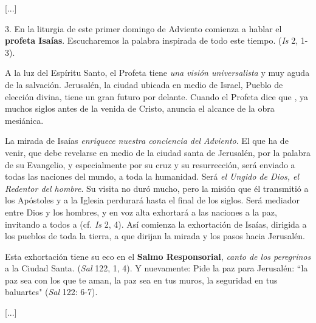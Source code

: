 \begin{body}
\begin{body}
		{[}...{]}
		
		3. En la liturgia de este primer domingo de Adviento comienza a hablar el \textbf{profeta Isaías}. Escucharemos la palabra inspirada de todo este tiempo.  (\emph{Is} 2, 1-3).
		
		A la luz del Espíritu Santo, el Profeta tiene \emph{una visión universalista} y muy aguda de la salvación. Jerusalén, la ciudad ubicada en medio de Israel, Pueblo de elección divina, tiene un gran futuro por delante. Cuando el Profeta dice que , ya muchos siglos antes de la venida de Cristo, anuncia el alcance de la obra mesiánica.
		
		La mirada de Isaías \emph{enriquece nuestra conciencia del Adviento}. El que ha de venir, que debe revelarse  en medio de la ciudad santa de Jerusalén, por la palabra de su Evangelio, y especialmente por su cruz y su resurrección, será enviado a todas las naciones del mundo, a toda la humanidad. Será \emph{el Ungido de Dios, el Redentor del hombre}. Su visita no duró mucho, pero la misión que él transmitió a los Apóstoles y a la Iglesia perdurará hasta el final de los siglos. Será mediador entre Dios y los hombres, y en voz alta exhortará a las naciones a la paz, invitando a todos a  (cf. \emph{Is} 2, 4). Así comienza la exhortación de Isaías, dirigida a los pueblos de toda la tierra, a que dirijan la mirada y los pasos hacia Jerusalén.
		
		Esta exhortación tiene su eco en el \textbf{Salmo Responsorial}, \emph{canto de los peregrinos} a la Ciudad Santa.  (\emph{Sal} 122, 1, 4). Y nuevamente: Pide la paz para Jerusalén: ``la paz sea con los que te aman, la paz sea en tus muros, la seguridad en tus baluartes" (\emph{Sal} 122: 6-7).
		
		{[}...{]}
		

\end{body}
\end{body}
